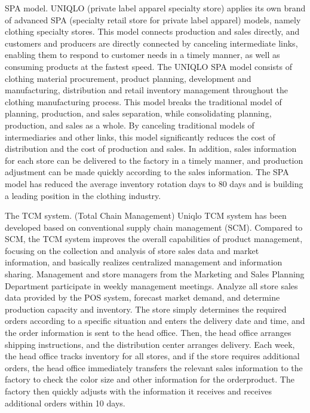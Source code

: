 \documentclass[]{article}
\begin{document}
SPA model. UNIQLO (private label apparel specialty store) applies its
own brand of advanced SPA (specialty retail store for private label
apparel) models, namely clothing specialty stores. This model connects
production and sales directly, and customers and producers are directly
connected by canceling intermediate links, enabling them to respond to
customer needs in a timely manner, as well as consuming products at the
fastest speed. The UNIQLO SPA model consists of clothing material
procurement, product planning, development and manufacturing,
distribution and retail inventory management throughout the clothing
manufacturing process. This model breaks the traditional model of
planning, production, and sales separation, while consolidating
planning, production, and sales as a whole. By canceling traditional
models of intermediaries and other links, this model significantly
reduces the cost of distribution and the cost of production and sales.
In addition, sales information for each store can be delivered to the
factory in a timely manner, and production adjustment can be made
quickly according to the sales information. The SPA model has reduced
the average inventory rotation days to 80 days and is building a leading
position in the clothing industry.

The TCM system. (Total Chain Management) Uniqlo TCM system has been
developed based on conventional supply chain management (SCM). Compared
to SCM, the TCM system improves the overall capabilities of product
management, focusing on the collection and analysis of store sales data
and market information, and basically realizes centralized management
and information sharing. Management and store managers from the
Marketing and Sales Planning Department participate in weekly management
meetings. Analyze all store sales data provided by the POS system,
forecast market demand, and determine production capacity and inventory.
The store simply determines the required orders according to a specific
situation and enters the delivery date and time, and the order
information is sent to the head office. Then, the head office arranges
shipping instructions, and the distribution center arranges delivery.
Each week, the head office tracks inventory for all stores, and if the
store requires additional orders, the head office immediately transfers
the relevant sales information to the factory to check the color size
and other information for the orderproduct. The factory then quickly
adjusts with the information it receives and receives additional orders
within 10 days.
\end{document}
